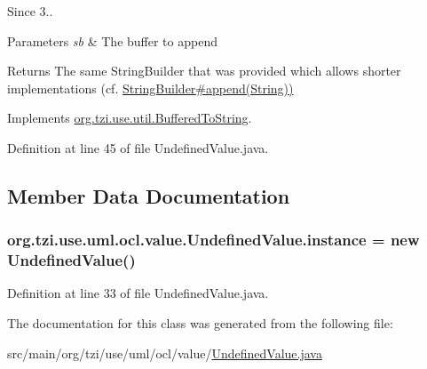 \begin{DoxySince}{Since}
3.. 
\end{DoxySince}

\begin{DoxyParams}{Parameters}
{\em sb} & The buffer to append \\
\hline
\end{DoxyParams}
\begin{DoxyReturn}{Returns}
The same String\-Builder that was provided which allows shorter implementations (cf. \hyperlink{}{String\-Builder\#append(\-String))} 
\end{DoxyReturn}


Implements \hyperlink{interfaceorg_1_1tzi_1_1use_1_1util_1_1_buffered_to_string_aea95e4e53b18818d50ee253700e6e2d5}{org.\-tzi.\-use.\-util.\-Buffered\-To\-String}.



Definition at line 45 of file Undefined\-Value.\-java.



\subsection{Member Data Documentation}
\hypertarget{classorg_1_1tzi_1_1use_1_1uml_1_1ocl_1_1value_1_1_undefined_value_af6ec66d5796559d7e0be6c8c79b7a8a6}{
\subsubsection[{instance}]{ org.\-tzi.\-use.\-uml.\-ocl.\-value.\-Undefined\-Value.\-instance = new {\bf Undefined\-Value}()\hspace{0.3cm}{\ttfamily [static]}}}\label{classorg_1_1tzi_1_1use_1_1uml_1_1ocl_1_1value_1_1_undefined_value_af6ec66d5796559d7e0be6c8c79b7a8a6}


Definition at line 33 of file Undefined\-Value.\-java.



The documentation for this class was generated from the following file\-:\begin{DoxyCompactItemize}
\item 
src/main/org/tzi/use/uml/ocl/value/\hyperlink{_undefined_value_8java}{Undefined\-Value.\-java}\end{DoxyCompactItemize}
